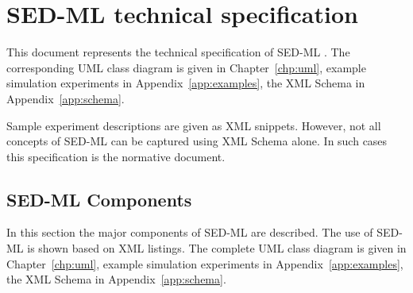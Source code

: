 \documentclass[pdftex,rgb,dvipsnames,svgnames,hyperref,table]{report}
\begin{document}

\tableofcontents
\newpage


\chapter{SED-ML technical specification}
\label{chp:specification}
This document represents the technical specification of SED-ML \currentLV. The corresponding UML class diagram is given in Chapter~\ref{chp:uml}, example simulation experiments in Appendix~\ref{app:examples}, the XML Schema in Appendix~\ref{app:schema}.

Sample experiment descriptions are given as XML snippets. However, not all concepts of SED-ML can be captured using XML Schema alone. In such cases this specification is the normative document. 






\pagebreak
\section{SED-ML Components}
\label{sec:components}
In this section the major components of SED-ML are described. The use of SED-ML is shown based on XML listings. The complete UML class diagram is given in Chapter~\ref{chp:uml}, example simulation experiments in Appendix~\ref{app:examples}, the XML Schema in Appendix~\ref{app:schema}.








\end{document}
